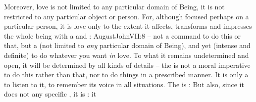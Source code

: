 Moreover, love is not limited to any particular domain of Being, it is not
restricted to any particular object or person.  For, although focused perhaps on
a particular person, it is love only to the extent it affects, transforms and
impresses the whole being with a  and : \citet{love, and
  do what you wilt}{AugustJohn}{VII:8} -- not a command to do this or that, but
a  (not limited to {\em any} particular domain of Being), and yet
 (intense and definite)  to do whatever you want {\em in}
love.  To what  it
 remains undetermined and open, it will be determined by all kinds
of details -- the  is not a moral imperative to do this rather than
that, nor to do things in a prescribed manner. It is only a  to
listen to it, to remember its  voice in all 
situations. The  is :  But also, since
it does not  any specific , it is : it



